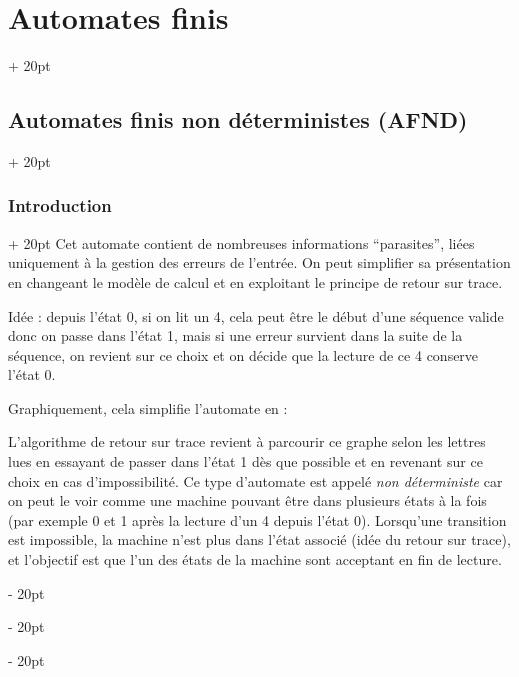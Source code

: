 \documentclass[a4paper, 12pt, twoside]{article}
\newcommand{\ind}[1][20pt]{\advance\leftskip + #1}
\newcommand{\deind}[1][20pt]{\advance\leftskip - #1}
\newenvironment{indt}[2][20pt]{#2 \par \ind[#1]}{\par \deind} %
\begin{document}
\begin{indt}{\section{Automates finis}}
\begin{indt}{\subsection{Automates finis non déterministes (AFND)}}
\begin{indt}{\subsubsection{Introduction}}
                Cet automate contient de nombreuses informations ``parasites'', liées uniquement à la gestion des erreurs de l'entrée. On peut simplifier sa présentation en changeant le modèle de calcul et en exploitant le principe de retour sur trace.

                Idée : depuis l'état 0, si on lit un 4, cela peut être le début d'une séquence valide donc on passe dans l'état 1, mais si une erreur survient dans la suite de la séquence, on revient sur ce choix et on décide que la lecture de ce 4 conserve l'état 0.

                Graphiquement, cela simplifie l'automate en :

                \begin{center}
                \end{center}

                L'algorithme de retour sur trace revient à parcourir ce graphe selon les lettres lues en essayant de passer dans l'état 1 dès que possible et en revenant sur ce choix en cas d'impossibilité.
                Ce type d'automate est appelé \emph{non déterministe} car on peut le voir comme une machine pouvant être dans plusieurs états à la fois (par exemple 0 et 1 après la lecture d'un 4 depuis l'état 0).
                Lorsqu'une transition est impossible, la machine n'est plus dans l'état associé (idée du retour sur trace), et l'objectif est que l'un des états de la machine sont acceptant en fin de lecture.
            \end{indt}

            \vspace{12pt}
            

\end{indt}
\end{indt}
\end{document}
